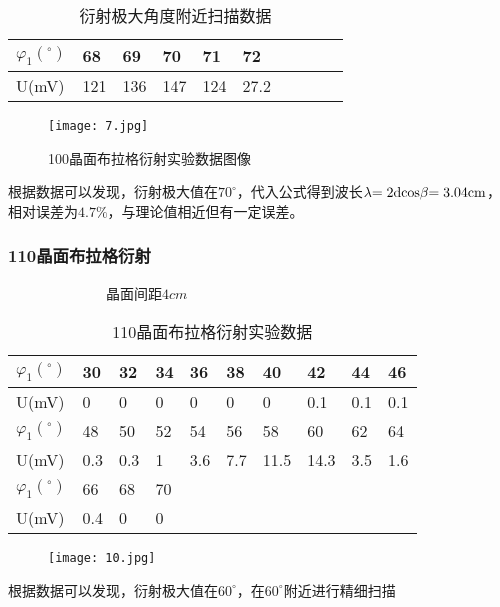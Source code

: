 \documentclass[12pt,a4paper]{article}
\begin{document}
        \begin{table}[H]
            \centering
            \caption{衍射极大角度附近扫描数据}
            \begin{tabular}{|l|l|l|l|l|l|l|l|l|l|}
            \hline
                $\varphi_1(^\circ)$ & 68 & 69 & 70 & 71 & 72 \\ \hline
                U(mV) & 121 & 136 & 147 & 124 & 27.2 \\ \hline
            \end{tabular}
        \end{table}

        \begin{figure}[H]
            \centering
            \caption{100晶面布拉格衍射实验数据图像}
            \texttt{[image: 7.jpg]}
        \end{figure}

        根据数据可以发现，衍射极大值在$70^{\circ}$，代入公式得到波长$\lambda {\rm{ = 2dcos}}\beta {\rm{ = 3}}{\rm{.04cm}}$，
        相对误差为$4.7\%$，与理论值相近但有一定误差。
    
    \subsubsection{110晶面布拉格衍射}   
    \begin{table}[H]
        \centering
        \caption{110晶面布拉格衍射实验数据}
        \raggedright{$\qquad\qquad\qquad\quad$晶面间距$4cm$\par}
        \centering
        \begin{tabular}{|l|l|l|l|l|l|l|l|l|l|}
        \hline
            $\varphi_1(^\circ)$ & 30 & 32 & 34 & 36 & 38 & 40 & 42 & 44 & 46 \\ \hline
            U(mV) & 0 & 0 & 0& 0 & 0 & 0 & 0.1 & 0.1 & 0.1 \\ \hline
            $\varphi_1(^\circ)$ & 48 & 50 & 52 & 54 & 56 & 58 & 60 & 62 & 64 \\ \hline
            U(mV) & 0.3 & 0.3 & 1 & 3.6 & 7.7 & 11.5 & 14.3 & 3.5 & 1.6 \\ \hline
            $\varphi_1(^\circ)$ & 66 & 68 & 70 & ~ & ~ & ~ & ~ & ~ & ~ \\ \hline
            U(mV) & 0.4 & 0 & 0 & ~ & ~ & ~ & ~ & ~ & ~ \\ \hline
        \end{tabular}
    \end{table}
\begin{figure}
    \centering
    \texttt{[image: 10.jpg]}
\end{figure}
    根据数据可以发现，衍射极大值在$60^{\circ}$，在$60^{\circ}$附近进行精细扫描
\end{document}
